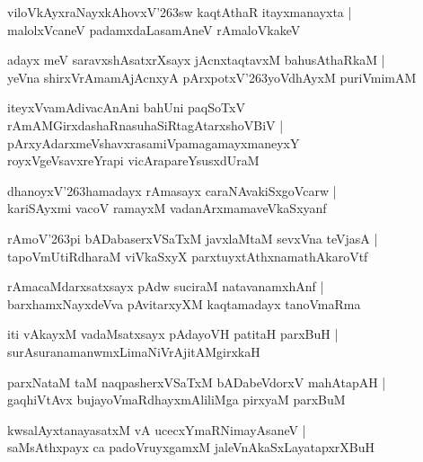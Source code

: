 \documentclass[twoside,12pt,openright]{book}
\def\S{\char'263}
\newcounter{shloka}[chapter]
\begin{document}
\begin{shloka}%
viloVkAyxraNayxkAhovxV\S sw kaqtAthaR itayxmanayxta |\\
malolxVcaneV padamxdaLasamAneV rAmaloVkakeV
\end{shloka}

\begin{shloka}%
adayx meV saravxshAsatxrXsayx jAcnxtaqtavxM bahusAthaRkaM |\\
yeVna shirxVrAmamAjAcnxyA pArxpotxV\S yoVdhAyxM puriVmimAM 
\end{shloka}

\begin{shloka}%
iteyxVvamAdivacAnAni bahUni paqSoTxV \\
rAmAMGirxdashaRnasuhaSiRtagAtarxshoVBiV |\\
pArxyAdarxmeVshavxrasamiVpamagamayxmaneyxY \\
royxVgeVsavxreYrapi vicArapareYsusxdUraM
\end{shloka}

\begin{shloka}%
dhanoyxV\S hamadayx rAmasayx caraNAvakiSxgoVcarw |\\
kariSAyxmi vacoV ramayxM vadanArxmamaveVkaSxyanf 
\end{shloka}

\begin{shloka}%
rAmoV\S pi bADabaserxVSaTxM javxlaMtaM sevxVna teVjasA |\\
tapoVmUtiRdharaM viVkaSxyX parxtuyxtAthxnamathAkaroVtf 
\end{shloka}

\begin{shloka}%
rAmacaMdarxsatxsayx pAdw suciraM natavanamxhAnf |\\
barxhamxNayxdeVva pAvitarxyXM kaqtamadayx tanoVmaRma
\end{shloka}

\begin{shloka}%
iti vAkayxM vadaMsatxsayx pAdayoVH patitaH parxBuH |\\
surAsuranamanwmxLimaNiVrAjitAMgirxkaH 
\end{shloka}

\begin{shloka}%
parxNataM taM naqpasherxVSaTxM bADabeVdorxV mahAtapAH |\\
gaqhiVtAvx bujayoVmaRdhayxmAliliMga pirxyaM parxBuM 
\end{shloka}

\begin{shloka}%
kwsalAyxtanayasatxM vA ucecxYmaRNimayAsaneV |\\
saMsAthxpayx ca padoVruyxgamxM jaleVnAkaSxLayatapxrXBuH 
\end{shloka}
\end{document}
